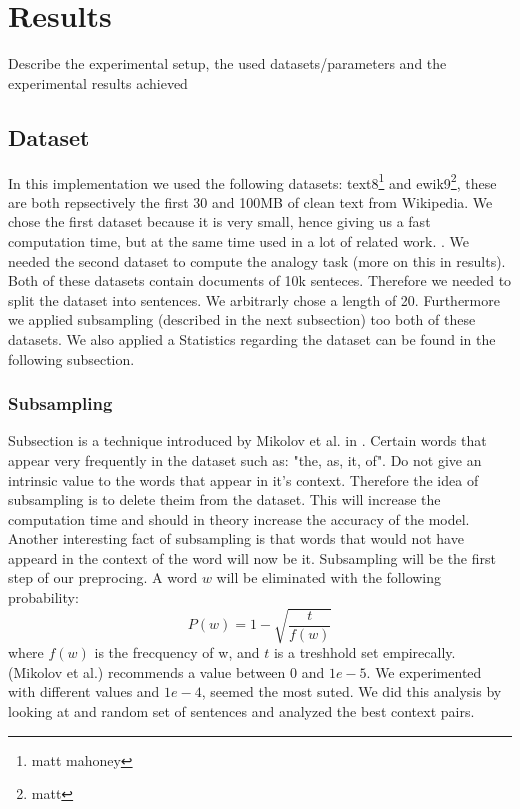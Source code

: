 \chapter{Results}\label{chap:results}


Describe the experimental setup, the used datasets/parameters and the experimental results achieved

\section{Dataset}
In this implementation we used the following datasets: text8\footnote{matt mahoney} and ewik9\footnote{matt}, these are both repsectively the first 30 and 100MB of clean text from Wikipedia. We chose the first dataset because it is very small, hence giving us a fast computation time, but at the same time used in a lot of related work. \cite{intel} \cite{gpu}. We needed the second dataset to compute the analogy task (more on this in results). 
Both of these datasets contain documents of 10k senteces. Therefore we needed to split the dataset into sentences. We arbitrarly chose a length of 20. Furthermore we applied subsampling (described in the next subsection)  too both of these datasets. We also applied a Statistics regarding the dataset can be found in the following subsection. 
\subsection{Subsampling}
Subsection is a technique introduced by Mikolov et al. in \cite{mikolov}. Certain words that appear very frequently in the dataset such as: "the, as, it, of". Do not give an intrinsic value to the words that appear in it's context. Therefore the idea of subsampling is to delete theim from the dataset. This will increase the computation time and should in theory increase the accuracy of the model. Another interesting fact of subsampling is that words that would not have appeard in the context of the word will now be it. 
Subsampling will be the first step of our preprocing. A word $w$ will be eliminated with the following probability:
\begin{equation}
P(w) = 1- \sqrt{{\frac{t}{f(w)}}}
\end{equation}
where $f(w)$ is the frecquency of w, and $t$ is a treshhold set empirecally. (Mikolov et al.)  recommends a value between $0$ and $1e-5$. We experimented with different values and $1e-4$, seemed the most suted. We did this analysis by looking at and random set of sentences and analyzed the best context pairs. 
